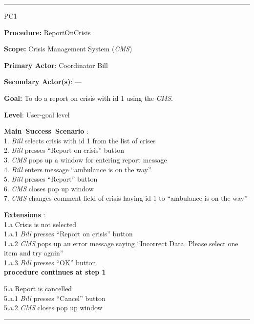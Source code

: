 \vspace{0.5cm}
\hrule
\begin{lyxlist}{PC1}
\small{
\item [\textbf{Procedure:}] ReportOnCrisis
\item [\textbf{Scope:}] Crisis Management System (\emph{CMS})
\item [\textbf{Primary Actor}:] Coordinator Bill
\item [\textbf{Secondary Actor(s)}:] ---
\item [\textbf{Goal:}] To do a report on crisis with id 1 using the \emph{CMS}.
\item [\textbf{Level}:] User-goal level
\item [\textbf{Main~Success~Scenario}]:\\
1. \emph{Bill} selects crisis with id 1 from the list of crises\\
2. \emph{Bill} presses ``Report on crisis'' button\\
3. \emph{CMS} pops up a window for entering report message\\
4. \emph{Bill} enters message ``ambulance is on the way''\\
5. \emph{Bill} presses ``Report'' button\\
6. \emph{CMS} closes pop up window\\
7. \emph{CMS} changes comment field of crisis having id 1 to ``ambulance is on
the way''\\

\item [\textbf{Extensions}]:\\
1.a Crisis is not selected\\
\hspace*{0.5cm} 1.a.1 \emph{Bill} presses ``Report on crisis'' button\\
\hspace*{0.5cm} 1.a.2 \emph{CMS} pops up an error message saying ``Incorrect
Data. Please select one item and try again''\\
\hspace*{0.5cm} 1.a.3 \emph{Bill} presses ``OK'' button\\
\hspace*{0.5cm} \textbf{procedure continues at step 1}

5.a Report is cancelled\\
\hspace*{0.5cm} 5.a.1 \emph{Bill} presses ``Cancel'' button\\
\hspace*{0.5cm} 5.a.2 \emph{CMS} closes pop up window\\
}
\end{lyxlist}
\hrule
\vspace{0.5cm}

